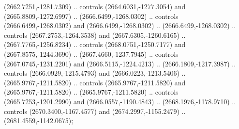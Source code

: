 \begin{scope}[shift={(28.3138,-376.6591)}]
\begin{scope}[shift={(-2186.6262,1813.8454)}]
      (2662.7251,-1281.7309) .. controls (2664.6031,-1277.3054) and
      (2665.8809,-1272.6997) .. (2666.6499,-1268.0302) .. controls
      (2666.6499,-1268.0302) and (2666.6499,-1268.0302) .. (2666.6499,-1268.0302) ..
      controls (2667.2753,-1264.3538) and (2667.6305,-1260.6165) ..
      (2667.7765,-1256.8234) .. controls (2668.0751,-1250.7177) and
      (2667.8575,-1244.3690) .. (2667.4660,-1237.7945) .. controls
      (2667.0745,-1231.2201) and (2666.5115,-1224.4213) .. (2666.1809,-1217.3987) ..
      controls (2666.0929,-1215.4793) and (2666.0223,-1213.5406) ..
      (2665.9767,-1211.5820) .. controls (2665.9767,-1211.5820) and
      (2665.9767,-1211.5820) .. (2665.9767,-1211.5820) .. controls
      (2665.7253,-1201.2990) and (2666.0557,-1190.4843) .. (2668.1976,-1178.9710) ..
      controls (2670.3400,-1167.4577) and (2674.2997,-1155.2479) ..
      (2681.4559,-1142.0675);


\end{scope}
\end{scope}
